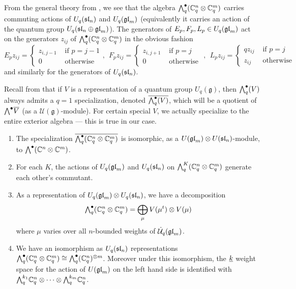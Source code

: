 \documentclass[11pt]{amsart}
\begin{document}
From the general theory from \cite{BZ}, we see that the algebra $ \Alt{\bullet}{q}(\bC_q^n \otimes \bC_q^m) $ carries commuting actions of $ U_q(\sl_n) $ and $ U_q(\gl_m) $ (equivalently it carries an action of the quantum group $ U_q(\sl_n \oplus \gl_m) $).  The generators of $E_p, F_p, L_p \in U_q(\gl_m) $ act on the generators $ z_{ij} $ of $\Alt{\bullet}{q}(\bC_q^n \otimes \bC_q^m) $ in the obvious fashion
$$ E_p z_{ij} = \begin{cases} z_{i,j-1} & \text{ if } p = j-1  \\
 0 & \text{  otherwise }
 \end{cases}, \ \ 
F_p z_{ij} = \begin{cases} z_{i,j+1} & \text{ if } p = j \\
 0 & \text{ otherwise }
 \end{cases}, \ \ 
L_p z_{ij} = \begin{cases} q z_{ij} & \text{ if } p = j \\
z_{ij} & \text{ otherwise }
\end{cases}$$
and similarly for the generators of $ U_q(\sl_n) $.

Recall from \cite{BZ} that if $ V $ is a representation of a quantum group $ U_q(\mathfrak{g}) $, then $ \Alt{\bullet}{q}(V) $ always admits a $ q=1 $ specialization, denoted $ \overline{\Alt{\bullet}{q}(V)}$, which will be a quotient of $ \Alt{\bullet}{} \overline{V} $ (as a $\mathcal{U}(\mathfrak{g})$-module). For certain special $ V $, we actually specialize to the entire exterior algebra --- this is true in our case.

\begin{thm} \label{th:qSkewHowe}\mbox{}
\begin{enumerate}
\item The specialization $\overline{\Alt{\bullet}{q}(\bC_q^n \otimes \bC_q^m)} $ is isomorphic, as a $U(\gl_m) \otimes U(\sl_n)$-module, to $ \Alt{\bullet}{}(\bC^n \otimes \bC^m) $.
\item For each $ K $, the actions of $ U_q(\gl_m) $ and $ U_q(\sl_n) $ on $ \Alt{K}{q}(\bC_q^n \otimes \bC_q^m) $ generate each other's commutant.
\item As a representation of $ U_q(\gl_m) \otimes U_q(\sl_n)  $, we have a decomposition
$$ \Alt{\bullet}{q} (\mathbb C^n_q \otimes \mathbb C^m_q) = \bigoplus_{\mu} V(\mu^t) \otimes V(\mu) $$
 where $\mu$ varies over all $n$-bounded weights of $ \dU(\gl_m)$.
\item We have an isomorphism as $ U_q(\sl_n) $ representations 
$ \Alt{\bullet}{q}(\mathbb C^n_q \otimes \mathbb C^m_q) \cong \Alt{\bullet}{q}(\bC_q^n)^{\otimes m} $.  Moreover under this isomorphism, the $ \ul{k} $ weight space for the action of $ U(\gl_m) $ on the left hand side is identified with $\Alt{k_1}{q} \mathbb C_q^n \otimes \cdots \otimes \Alt{k_m}{q} \mathbb C_q^n$.
\end{enumerate}
\end{thm}
\end{document}
